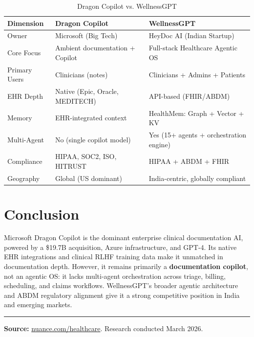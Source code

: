 \documentclass[12pt,a4paper]{article}
\begin{document}
\begin{table}[H]\centering\renewcommand{\arraystretch}{1.5}
\begin{tabularx}{\textwidth}{lXX}\toprule
\textbf{Dimension} & \textbf{Dragon Copilot} & \textbf{WellnessGPT}\\\midrule
Owner        & Microsoft (Big Tech)              & HeyDoc AI (Indian Startup) \\
Core Focus   & Ambient documentation + Copilot   & Full-stack Healthcare Agentic OS \\
Primary Users & Clinicians (notes)               & Clinicians + Admins + Patients \\
EHR Depth    & Native (Epic, Oracle, MEDITECH)   & API-based (FHIR/ABDM) \\
Memory       & EHR-integrated context            & HealthMem: Graph + Vector + KV \\
Multi-Agent  & No (single copilot model)         & Yes (15+ agents + orchestration engine) \\
Compliance   & HIPAA, SOC2, ISO, HITRUST         & HIPAA + ABDM + FHIR \\
Geography    & Global (US dominant)              & India-centric, globally compliant \\
\bottomrule\end{tabularx}\caption{Dragon Copilot vs. WellnessGPT}\end{table}

\section{Conclusion}
Microsoft Dragon Copilot is the dominant enterprise clinical documentation AI, powered by a \$19.7B acquisition, Azure infrastructure, and GPT-4. Its native EHR integrations and clinical RLHF training data make it unmatched in documentation depth. However, it remains primarily a \textbf{documentation copilot}, not an agentic OS: it lacks multi-agent orchestration across triage, billing, scheduling, and claims workflows. WellnessGPT's broader agentic architecture and ABDM regulatory alignment give it a strong competitive position in India and emerging markets.

\vspace{0.5cm}\hrule\vspace{0.3cm}
\small\textbf{Source:} \href{https://nuance.com/healthcare}{nuance.com/healthcare}. Research conducted March 2026.
\end{document}
